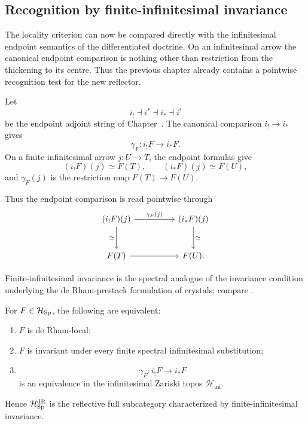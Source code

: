 \subsection{Recognition by finite-infinitesimal invariance}
\label{sec:finite-crystals}

The locality criterion can now be compared directly with the infinitesimal
endpoint semantics of the differentiated doctrine. On an infinitesimal arrow
the canonical endpoint comparison is nothing other than restriction from the
thickening to its centre. Thus the previous chapter already contains a
pointwise recognition test for the new reflector.

Let
\[
  i_!\dashv i^*\dashv i_*\dashv i^!
\]
be the endpoint adjoint string of
Chapter~. The canonical comparison
\(i_!\to i_*\) gives
\[
  \gamma_F:i_!F\longrightarrow i_*F.
\]
On a finite infinitesimal arrow \(j:U\to T\), the endpoint formulas give
\[
  (i_!F)(j)\simeq F(T),
  \qquad
  (i_*F)(j)\simeq F(U),
\]
and \(\gamma_F(j)\) is the restriction map \(F(T)\to F(U)\).

Thus the endpoint comparison is read pointwise through
\[
\begin{tikzcd}[column sep=huge,row sep=large]
  (i_!F)(j)
    \arrow[r,"\gamma_F(j)"]
    \arrow[d,"\simeq"']
  &
  (i_*F)(j)
    \arrow[d,"\simeq"]
  \\
  F(T)
    \arrow[r]
  &
  F(U).
\end{tikzcd}
\]


\begin{remark}
\label{rem:crystal-recognition-only}
Finite-infinitesimal invariance is the spectral analogue of the invariance condition
underlying the de Rham-prestack formulation of crystals; compare
\cite{GaitsgoryRozenblyumCrystals}.
\end{remark}

\begin{theorem}
\label{thm:crystalline-recognition}
For \(F\in\mathcal H_{\operatorname{Sp}}\), the following are equivalent:
\begin{enumerate}
\item \(F\) is de Rham-local;
\item \(F\) is invariant under every finite spectral infinitesimal substitution;
\item
\[
  \gamma_F:i_!F\longrightarrow i_*F
\]
is an equivalence in the infinitesimal Zariski topos \(\mathcal H_{\inf}\).
\end{enumerate}
Hence \(\mathcal H_{\operatorname{Sp}}^{\mathrm{dR}}\) is the reflective full subcategory
characterized by finite-infinitesimal invariance.
\end{theorem}

